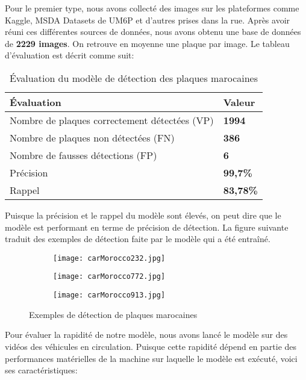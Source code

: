     
    Pour le premier type, nous avons collecté des images sur les plateformes comme Kaggle, MSDA Datasets de UM6P et d’autres prises dans la rue. Après avoir réuni ces différentes sources de données, nous avons obtenu une base de données de \textbf{2229 images}. On retrouve en moyenne une plaque par image. Le tableau d’évaluation est décrit comme suit:
    \begin{table}[H]
        \centering
        \begin{tabular}{|l|l|}
            \hline
            \rowcolor{Gray}
            \textbf{Évaluation} & \textbf{Valeur} \\ \hline
            Nombre de plaques correctement détectées (VP) & \textbf{1994} \\ \hline
            Nombre de plaques non détectées (FN) & \textbf{386} \\ \hline
            Nombre de fausses détections (FP) & \textbf{6} \\ \hline
            Précision & \textbf{99,7\%} \\ \hline
            Rappel & \textbf{83,78\%} \\ \hline
        \end{tabular}
        \caption{Évaluation du modèle de détection des plaques marocaines}
    \end{table}
    Puisque la précision et le rappel du modèle sont élevés, on peut dire que le modèle est performant en terme de précision de détection. La figure suivante traduit des exemples de détection faite par le modèle qui a été entraîné.
    \begin{figure}[H]
        \begin{subfigure}{0.3\textwidth}
            \centering
            \texttt{[image: carMorocco232.jpg]}
        \end{subfigure}
        \hfill
        \begin{subfigure}{0.3\textwidth}
            \centering
            \texttt{[image: carMorocco772.jpg]}
        \end{subfigure}
        \hfill
        \begin{subfigure}{0.3\textwidth}
            \centering
            \texttt{[image: carMorocco913.jpg]}
        \end{subfigure}
        \caption{Exemples de détection de plaques marocaines}
    \end{figure}
    Pour évaluer la rapidité de notre modèle, nous avons lancé le modèle sur des vidéos des véhicules en circulation. Puisque cette rapidité dépend en partie des performances matérielles de la machine sur laquelle le modèle est exécuté, voici ses caractéristiques:
